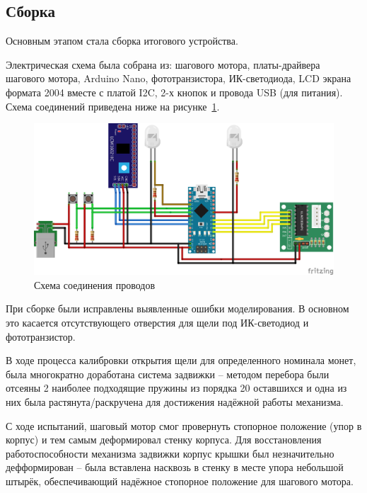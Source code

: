 \subsection{Сборка}

Основным этапом стала сборка итогового устройства.
\par\medskip

Электрическая схема была собрана из: шагового мотора, платы-драйвера шагового мотора, Arduino Nano, фототранзистора, ИК-светодиода, LCD экрана формата 2004 вместе с платой I2C, 2-х кнопок и провода USB (для питания). Схема соединений приведена ниже на рисунке~\ref{ris:scheme_electric}.

\begin{figure}[H]
	\centering
	\includegraphics[width=12cm]{pics/scheme_png.png}
	\caption{Схема соединения проводов}
	\label{ris:scheme_electric}
\end{figure}

При сборке были исправлены выявленные ошибки моделирования. В основном это касается отсутствующего отверстия для щели под ИК-светодиод и фототранзистор.
\par\medskip

В ходе процесса калибровки открытия щели для определенного номинала монет, была многократно доработана система задвижки -- методом перебора были отсеяны 2 наиболее подходящие пружины из порядка 20 оставшихся и одна из них была растянута/раскручена для достижения надёжной работы механизма.
\par\medskip

С ходе испытаний, шаговый мотор смог провернуть стопорное положение (упор в корпус) и тем самым деформировал стенку корпуса. Для восстановления работоспособности механизма задвижки корпус крышки был незначительно дефформирован -- была вставлена насквозь в стенку в месте упора небольшой штырёк, обеспечивающий надёжное стопорное положение для шагового мотора.
